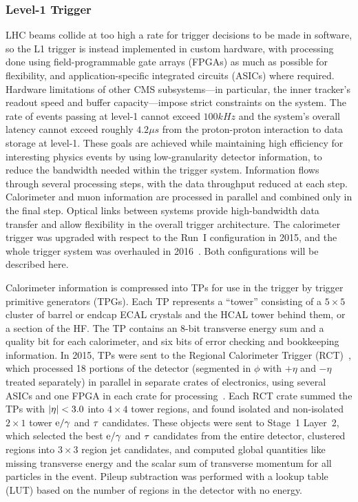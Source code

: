 \subsubsection{Level-1 Trigger}\label{sec:l1trig}
LHC beams collide at too high a rate for trigger decisions to be made in software, so the L1 trigger is instead implemented in custom hardware, with processing done using field-programmable gate arrays (FPGAs) as much as possible for flexibility, and application-specific integrated circuits (ASICs) where required.
Hardware limitations of other CMS subsystems---in particular, the inner tracker's readout speed and buffer capacity---impose strict constraints on the system.
The rate of events passing at level-1 cannot exceed $100\unit{kHz}$ and the system's overall latency cannot exceed roughly $4.2\unit{\mu s}$ from the proton-proton interaction to data storage at level-1.
These goals are achieved while maintaining high efficiency for interesting physics events by using low-granularity detector information, to reduce the bandwidth needed within the trigger system.
Information flows through several processing steps, with the data throughput reduced at each step.
Calorimeter and muon information are processed in parallel and combined only in the final step.
Optical links between systems provide high-bandwidth data transfer and allow flexibility in the overall trigger architecture.
The calorimeter trigger was upgraded with respect to the Run~I configuration in 2015, and the whole trigger system was overhauled in 2016~\cite{Tapper:1556311}.
Both configurations will be described here.

Calorimeter information is compressed into TPs for use in the trigger by trigger primitive generators (TPGs).
Each TP represents a ``tower'' consisting of a $5 \times 5$ cluster of barrel or endcap ECAL crystals and the HCAL tower behind them, or a section of the HF\@.
The TP contains an 8-bit transverse energy sum and a quality bit for each calorimeter, and six bits of error checking and bookkeeping information.
In 2015, TPs were sent to the Regional Calorimeter Trigger (RCT)~\cite{Chumney:2003ip}, which processed 18 portions of the detector (segmented in $\phi$ with $+\eta$ and $-\eta$ treated separately) in parallel in separate crates of electronics, using several ASICs and one FPGA in each crate for processing~\cite{Kreis:2015jjr}.
Each RCT crate summed the TPs with $\lvert \eta \rvert < 3.0$ into $4 \times 4$ tower regions, and found isolated and non-isolated $2 \times 1$ tower $\mathrm{e}/\mathrm{\gamma}$ and $\mathrm{\tau}$ candidates.
These objects were sent to Stage~1 Layer~2, which selected the best $\mathrm{e}/\mathrm{\gamma}$ and $\mathrm{\tau}$ candidates from the entire detector, clustered regions into $3 \times 3$ region jet candidates, and computed global quantities like missing transverse energy and the scalar sum of transverse momentum for all particles in the event.
Pileup subtraction was performed with a lookup table (LUT) based on the number of regions in the detector with no energy.

